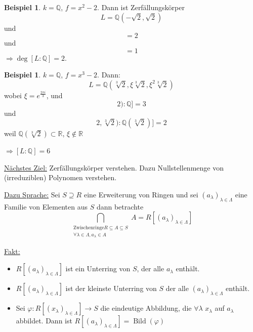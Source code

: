 \documentclass[12pt,parskip=full]{scrartcl}
\newcommand{\setQ}{\mathbb{Q}}
\newcommand{\setR}{\mathbb{R}}
\newcommand{\heading}{\underline}
\theoremstyle{definition}
\newtheorem{example}[theorem]{Beispiel}
\theoremstyle{remark}
\begin{document}
	\begin{example}
		$k = \setQ$, $f = x^2 - 2$. Dann ist Zerfällungskörper
		\begin{equation*}
			L = \setQ(- \sqrt{2}, \sqrt{2})
		\end{equation*}
		und
		\begin{equation*}
			[\setQ(\sqrt{2}) : \setQ] = 2
		\end{equation*}
		und
		\begin{equation*}
			[\setQ(\sqrt{2}, - \sqrt{2}) : \setQ(\sqrt{2})] = 1
		\end{equation*}
		$\Rightarrow \deg[L : \setQ] = 2$.
	\end{example}

	\begin{example}
		$k = \setQ$, $f = x^3 - 2$. Dann:
		\begin{equation*}
			L = \setQ(\sqrt[3]{2}, \xi \sqrt[3]{2}, \xi^2 \sqrt[3]{2})
		\end{equation*}
		wobei $\xi = e^{\frac{2 \pi i}{3}}$, und
		\begin{equation*}
			[\setQ(\sqrt[3]{2}) : \setQ] = 3
		\end{equation*}
		und
		\begin{equation*}
			[\setQ(\xi \cdot \sqrt[3]{2}, \sqrt[3]{2}) : \setQ(\sqrt[3]{2})] = 2
		\end{equation*}
		weil $\setQ(\sqrt[3]{2}) \subset \setR$, $\xi \notin \setR$
		
		$\Rightarrow [L : \setQ] = 6$
	\end{example}

	\heading{Nächstes Ziel:} Zerfällungskörper verstehen. Dazu Nullstellenmenge von (irreduziblen) Polynomen verstehen.
	
	\heading{Dazu Sprache:} Sei $S \supseteq R$ eine Erweiterung von Ringen und sei $(a_\lambda)_{\lambda \in \Lambda}$ eine Familie von Elementen aus $S$ dann betrachte
	\begin{equation*}
		\bigcap_{\substack{\text{Zwischenringe} R \subseteq A \subseteq S \\ \forall \lambda \in \Lambda, a_\lambda \in A}} A = R[(a_\lambda)_{\lambda \in \Lambda}]
	\end{equation*}
	
	\heading{Fakt:}
	\begin{itemize}
		\item $R[(a_\lambda)_{\lambda \in \Lambda}]$ ist ein Unterring von $S$, der alle $a_\lambda$ enthält.
		\item $R[(a_\lambda)_{\lambda \in \Lambda}]$ ist der kleinste Unterring von $S$ der alle $(a_\lambda)_{\lambda \in \Lambda}$ enthält.
		\item Sei $\varphi: R[(x_\lambda)_{\lambda \in \Lambda}] \to S$ die eindeutige Abbildung, die $\forall \lambda$ $x_\lambda$ auf $a_\lambda$ abbildet. Dann ist $R[(a_\lambda)_{\lambda \in \Lambda}] = \operatorname{Bild}(\varphi)$
	\end{itemize}
\end{document}
